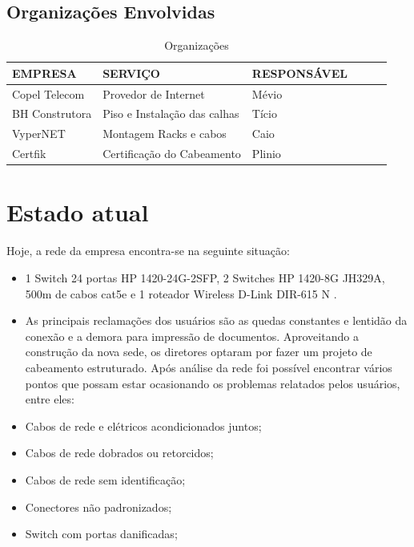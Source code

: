 \documentclass[	DIV=calc,%
paper=a4,%
fontsize=12pt,%
onecolumn]{scrartcl}	 					%
\begin{document}
	\subsection{Organizações Envolvidas}
	\begin{table}[h!] %
		\centering
		\caption{Organizações}
		\label{tab1} %
		\begin{tabular}{llllll}
			\toprule
			{\textbf{EMPRESA}} & {\textbf{SERVIÇO}} & {\textbf{RESPONSÁVEL}} \\
			\midrule 
			Copel Telecom  & Provedor de Internet          & Mévio \\ 		
			BH Construtora & Piso e Instalação das calhas  & Tício\\ 
			VyperNET       & Montagem Racks e cabos        & Caio \\ 
			Certfik       & Certificação do Cabeamento     & Plinio \\
			\bottomrule
		\end{tabular}
	\end{table}
	
	
	
	\section{Estado atual}
	Hoje, a rede da empresa encontra-se na seguinte situação:
	\begin{itemize}
		\item 1 Switch 24 portas HP 1420-24G-2SFP, 2 Switches HP 1420-8G JH329A, 500m de cabos cat5e e 1 roteador Wireless D-Link DIR-615 N .
		\item As principais reclamações dos usuários são as quedas constantes e lentidão da conexão e a demora para impressão de documentos. Aproveitando a construção da nova sede, os diretores optaram por fazer um projeto de cabeamento estruturado.
	Após análise da rede foi possível encontrar vários pontos que possam estar ocasionando os problemas relatados pelos usuários, entre eles:
		\item Cabos de rede e elétricos acondicionados juntos;
		\item Cabos de rede dobrados ou retorcidos;
		\item Cabos de rede sem identificação;		
		\item Conectores não padronizados;
		\item Switch com portas danificadas;
	\end{itemize}
	
\end{document}

